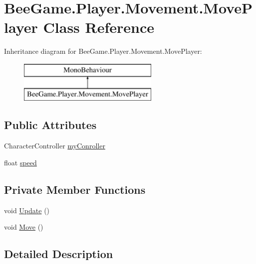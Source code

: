 \hypertarget{class_bee_game_1_1_player_1_1_movement_1_1_move_player}{}\section{Bee\+Game.\+Player.\+Movement.\+Move\+Player Class Reference}
\label{class_bee_game_1_1_player_1_1_movement_1_1_move_player}
Inheritance diagram for Bee\+Game.\+Player.\+Movement.\+Move\+Player\+:\begin{figure}[H]
\begin{center}
\leavevmode
\includegraphics[height=2.000000cm]{class_bee_game_1_1_player_1_1_movement_1_1_move_player}
\end{center}
\end{figure}
\subsection*{Public Attributes}
\begin{DoxyCompactItemize}
\item 
Character\+Controller \hyperlink{class_bee_game_1_1_player_1_1_movement_1_1_move_player_a386e52132d02c2d1c7a2cec66fc223d4}{my\+Conroller}
\item 
float \hyperlink{class_bee_game_1_1_player_1_1_movement_1_1_move_player_a1c75a28f84c06c8d446d3880338ceee8}{speed}
\end{DoxyCompactItemize}
\subsection*{Private Member Functions}
\begin{DoxyCompactItemize}
\item 
void \hyperlink{class_bee_game_1_1_player_1_1_movement_1_1_move_player_af8a97d75b3d79d0773579b8651e2fde2}{Update} ()
\item 
void \hyperlink{class_bee_game_1_1_player_1_1_movement_1_1_move_player_a2ec43ce7923ff96fa77b358f02d1ab37}{Move} ()
\end{DoxyCompactItemize}


\subsection{Detailed Description}


